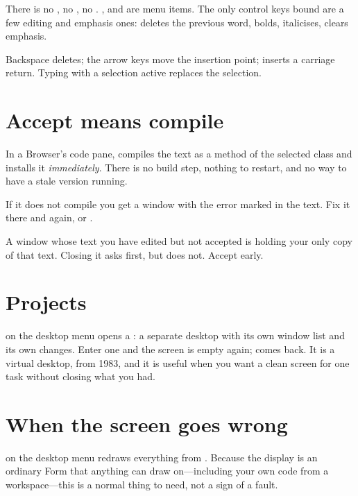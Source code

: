 There is no , no , no . ,
 and  are menu items. The only control keys bound are a
few editing and emphasis ones:  deletes the previous word,
 bolds,  italicises,  clears emphasis.

\begin{stnote}
Backspace deletes; the arrow keys move the insertion point; 
inserts a carriage return. Typing with a selection active replaces the
selection.
\end{stnote}

\section{Accept means compile}

In a Browser's code pane,  compiles the text as a method of the
selected class and installs it \emph{immediately}. There is no build step,
nothing to restart, and no way to have a stale version running.

If it does not compile you get a  window with the error marked
in the text. Fix it there and  again, or .

\begin{stwarn}
A window whose text you have edited but not accepted is holding your only copy
of that text. Closing it asks first, but  does not. Accept early.
\end{stwarn}

\section{Projects}

 on the desktop menu opens a : a separate desktop with
its own window list and its own changes. Enter one and the screen is empty
again;  comes back. It is a virtual desktop, from 1983, and
it is useful when you want a clean screen for one task without closing what
you had.

\section{When the screen goes wrong}

 on the desktop menu redraws everything from
. Because the display is an ordinary Form that
anything can draw on---including your own code from a workspace---this is a
normal thing to need, not a sign of a fault.

